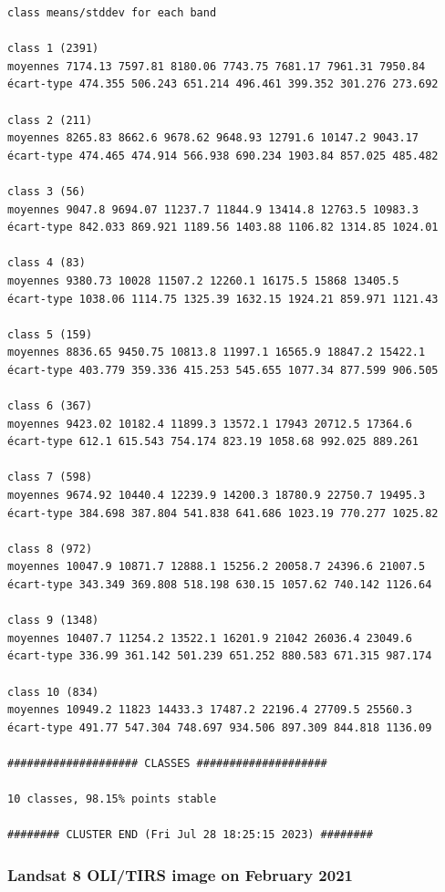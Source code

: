 \documentclass[earth,article,submit,pdftex,moreauthors]{Definitions/mdpi}
\begin{document}
{\begin{scriptsize}
\begin{verbatim}
class means/stddev for each band

class 1 (2391)
moyennes 7174.13 7597.81 8180.06 7743.75 7681.17 7961.31 7950.84
écart-type 474.355 506.243 651.214 496.461 399.352 301.276 273.692

class 2 (211)
moyennes 8265.83 8662.6 9678.62 9648.93 12791.6 10147.2 9043.17
écart-type 474.465 474.914 566.938 690.234 1903.84 857.025 485.482

class 3 (56)
moyennes 9047.8 9694.07 11237.7 11844.9 13414.8 12763.5 10983.3
écart-type 842.033 869.921 1189.56 1403.88 1106.82 1314.85 1024.01

class 4 (83)
moyennes 9380.73 10028 11507.2 12260.1 16175.5 15868 13405.5
écart-type 1038.06 1114.75 1325.39 1632.15 1924.21 859.971 1121.43

class 5 (159)
moyennes 8836.65 9450.75 10813.8 11997.1 16565.9 18847.2 15422.1
écart-type 403.779 359.336 415.253 545.655 1077.34 877.599 906.505

class 6 (367)
moyennes 9423.02 10182.4 11899.3 13572.1 17943 20712.5 17364.6
écart-type 612.1 615.543 754.174 823.19 1058.68 992.025 889.261

class 7 (598)
moyennes 9674.92 10440.4 12239.9 14200.3 18780.9 22750.7 19495.3
écart-type 384.698 387.804 541.838 641.686 1023.19 770.277 1025.82

class 8 (972)
moyennes 10047.9 10871.7 12888.1 15256.2 20058.7 24396.6 21007.5
écart-type 343.349 369.808 518.198 630.15 1057.62 740.142 1126.64

class 9 (1348)
moyennes 10407.7 11254.2 13522.1 16201.9 21042 26036.4 23049.6
écart-type 336.99 361.142 501.239 651.252 880.583 671.315 987.174

class 10 (834)
moyennes 10949.2 11823 14433.3 17487.2 22196.4 27709.5 25560.3
écart-type 491.77 547.304 748.697 934.506 897.309 844.818 1136.09

#################### CLASSES ####################

10 classes, 98.15% points stable

######## CLUSTER END (Fri Jul 28 18:25:15 2023) ########

\end{verbatim}
\end{scriptsize}

\subsubsection[\appendixname~\thesubsubsection]{Landsat 8 OLI/TIRS image on February 2021}
\begin{scriptsize}
\begin{verbatim}


\end{verbatim}
\end{scriptsize}}
\end{document}
